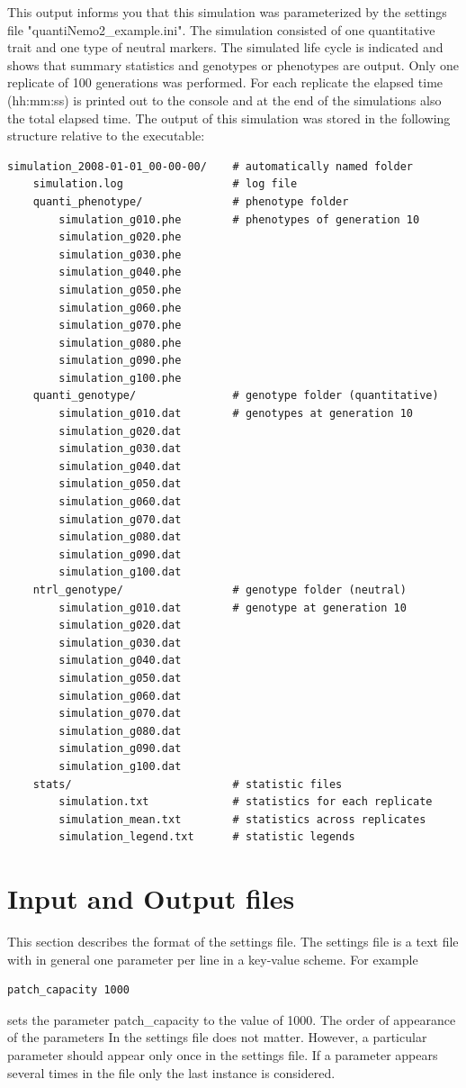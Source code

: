 \documentclass[letterpaper,12pt,oneside]{book}
\begin{document}
This output informs you that this simulation was parameterized by the settings file "quantiNemo2\_example.ini". The simulation consisted of one quantitative trait and one type of neutral markers. The simulated life cycle is indicated and shows that summary statistics and genotypes or phenotypes are output. Only one replicate of 100 generations was performed. For each replicate the elapsed time (hh:mm:ss) is printed out to the console and at the end of the simulations also the total elapsed time. 
The output of this simulation was stored in the following structure relative to the executable:
\begin{lstlisting}[frame=single]
simulation_2008-01-01_00-00-00/    # automatically named folder
    simulation.log                 # log file
    quanti_phenotype/              # phenotype folder 
        simulation_g010.phe        # phenotypes of generation 10
        simulation_g020.phe
        simulation_g030.phe
        simulation_g040.phe
        simulation_g050.phe
        simulation_g060.phe
        simulation_g070.phe
        simulation_g080.phe
        simulation_g090.phe
        simulation_g100.phe
    quanti_genotype/               # genotype folder (quantitative)
        simulation_g010.dat        # genotypes at generation 10
        simulation_g020.dat
        simulation_g030.dat
        simulation_g040.dat
        simulation_g050.dat
        simulation_g060.dat
        simulation_g070.dat
        simulation_g080.dat
        simulation_g090.dat
        simulation_g100.dat
    ntrl_genotype/                 # genotype folder (neutral)
        simulation_g010.dat        # genotype at generation 10
        simulation_g020.dat
        simulation_g030.dat
        simulation_g040.dat
        simulation_g050.dat
        simulation_g060.dat
        simulation_g070.dat
        simulation_g080.dat
        simulation_g090.dat
        simulation_g100.dat
    stats/                         # statistic files
        simulation.txt             # statistics for each replicate
        simulation_mean.txt        # statistics across replicates
        simulation_legend.txt      # statistic legends
\end{lstlisting}
\newpage
\chapter{Input and Output files}\label{chap:settingsFile}
This section describes the format of the settings file. The settings file is a text file with in general one parameter per line in a key-value scheme. For example
\begin{lstlisting}[frame=single]
patch_capacity 1000
\end{lstlisting}
sets the parameter \textsf{patch\_capacity} to the value of 1000. The order of appearance of the parameters In the settings file does not matter. However, a particular parameter should appear only once in the settings file. If a parameter appears several times in the file only the last instance is considered. 
\end{document}
